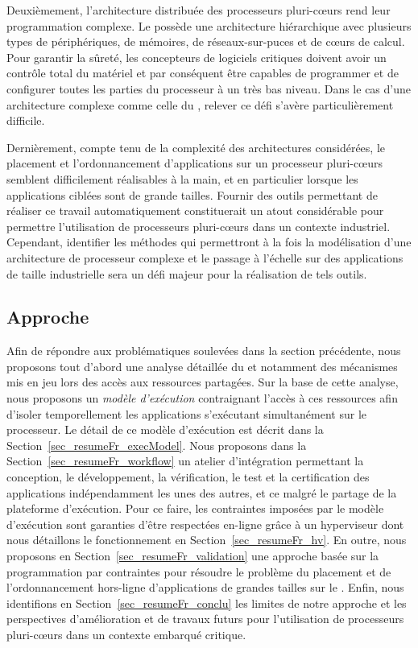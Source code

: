 \documentclass[main.tex]{subfiles}
\begin{document}
Deuxièmement, l'architecture distribuée des processeurs pluri-c\oe{}urs rend leur programmation complexe. Le \mppalong possède une architecture hiérarchique avec plusieurs types de périphériques, de mémoires, de réseaux-sur-puces et de c\oe{}urs de calcul. Pour garantir la sûreté, les concepteurs de logiciels critiques doivent avoir un contrôle total du matériel et par conséquent être capables de programmer et de configurer toutes les parties du processeur à un très bas niveau. Dans le cas d'une architecture complexe comme celle du \mppalong, relever ce défi s'avère particulièrement difficile.

Dernièrement, compte tenu de la complexité des architectures considérées, le placement et l'ordonnancement d'applications sur un processeur pluri-c\oe{}urs semblent difficilement réalisables à la main, et en particulier lorsque les applications ciblées sont de grande tailles. Fournir des outils permettant de réaliser ce travail automatiquement constituerait un atout considérable pour permettre l'utilisation de processeurs pluri-c\oe{}urs dans un contexte industriel. Cependant, identifier les méthodes qui permettront à la fois la modélisation d'une architecture de processeur complexe et le passage à l'échelle sur des applications de taille industrielle sera un défi majeur pour la réalisation de tels outils.



\subsection{Approche}

Afin de répondre aux problématiques soulevées dans la section précédente, nous proposons tout d'abord une analyse détaillée du \mppalong et notamment des mécanismes mis en jeu lors des accès aux ressources partagées. Sur la base de cette analyse, nous proposons un \emph{modèle d'exécution} contraignant l'accès à ces ressources afin d'isoler temporellement les applications s'exécutant simultanément sur le processeur. Le détail de ce modèle d'exécution est décrit dans la Section~\ref{sec_resumeFr_execModel}. Nous proposons dans la Section~\ref{sec_resumeFr_workflow} un atelier d'intégration permettant la conception, le développement, la vérification, le test et la certification des applications indépendamment les unes des autres, et ce malgré le partage de la plateforme d'exécution. Pour ce faire, les contraintes imposées par le modèle d'exécution sont garanties d'être respectées en-ligne grâce à un hyperviseur dont nous détaillons le fonctionnement en Section~\ref{sec_resumeFr_hv}. En outre, nous proposons en Section~\ref{sec_resumeFr_validation} une approche basée sur la programmation par contraintes pour résoudre le problème du placement et de l'ordonnancement hors-ligne d'applications de grandes tailles sur le \mppalong. Enfin, nous identifions en Section~\ref{sec_resumeFr_conclu} les limites de notre approche et les perspectives d'amélioration et de travaux futurs pour l'utilisation de processeurs pluri-c\oe{}urs dans un contexte embarqué critique.
\end{document}
